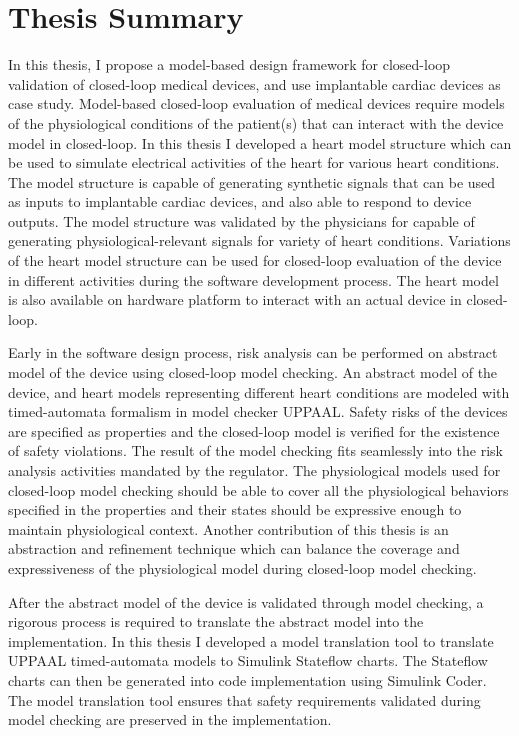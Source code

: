 \documentclass[a4paper]{article}
\begin{document}
\section*{Thesis Summary}
In this thesis, I propose a model-based design framework for closed-loop validation of closed-loop medical devices, and use implantable cardiac devices as case study. 
Model-based closed-loop evaluation of medical devices require models of the physiological conditions of the patient(s) that can interact with the device model in closed-loop. 
In this thesis I developed a heart model structure which can be used to simulate electrical activities of the heart for various heart conditions.
The model structure is capable of generating synthetic signals that can be used as inputs to implantable cardiac devices, and also able to respond to device outputs. 
The model structure was validated by the physicians for capable of generating physiological-relevant signals for variety of heart conditions.
Variations of the heart model structure can be used for closed-loop evaluation of the device in different activities during the software development process. 
The heart model is also available on hardware platform to interact with an actual device in closed-loop.

Early in the software design process, risk analysis can be performed on abstract model of the device using closed-loop model checking.
An abstract model of the device, and heart models representing different heart conditions are modeled with timed-automata formalism in model checker UPPAAL.
Safety risks of the devices are specified as properties and the closed-loop model is verified for the existence of safety violations.
The result of the model checking fits seamlessly into the risk analysis activities mandated by the regulator.
The physiological models used for closed-loop model checking should be able to cover all the physiological behaviors specified in the properties and their states should be expressive enough to maintain physiological context. 
Another contribution of this thesis is an abstraction and refinement technique which can balance the coverage and expressiveness of the physiological model during closed-loop model checking.

After the abstract model of the device is validated through model checking, a rigorous process is required to translate the abstract model into the implementation. 
In this thesis I developed a model translation tool to translate UPPAAL timed-automata models to Simulink Stateflow charts.
The Stateflow charts can then be generated into code implementation using Simulink Coder.
The model translation tool ensures that safety requirements validated during model checking are preserved in the implementation.
\end{document}
